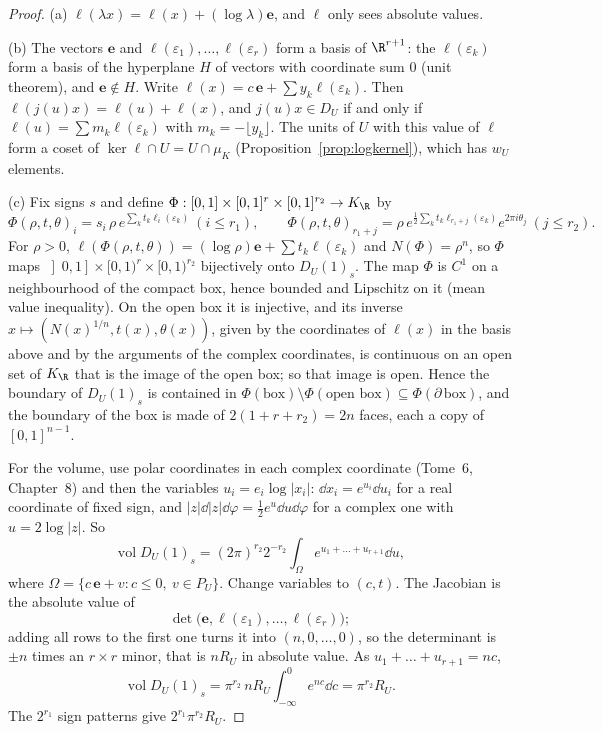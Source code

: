 \begin{proof}
(a) $\ell(\lambda x)=\ell(x)+(\log\lambda)\mathbf e$, and $\ell$ only sees absolute values.

(b) The vectors $\mathbf e$ and $\ell(\varepsilon_1),\dots,\ell(\varepsilon_r)$ form a basis of $\R^{r+1}$: the $\ell(\varepsilon_k)$ form a basis of
the hyperplane $H$ of vectors with coordinate sum $0$ (unit theorem), and $\mathbf e\notin H$. Write $\ell(x)=c\,\mathbf e+\sum
y_k\ell(\varepsilon_k)$. Then $\ell(j(u)x)=\ell(u)+\ell(x)$, and $j(u)x\in D_U$ if and only if $\ell(u)=\sum m_k\ell(\varepsilon_k)$ with
$m_k=-\lfloor y_k\rfloor$. The units of $U$ with this value of $\ell$ form a coset of $\ker\ell\cap U=U\cap\mu_K$
(Proposition~\ref{prop:logkernel}), which has $w_U$ elements.

(c) Fix signs $s$ and define $\Phi:[0,1]\times[0,1]^r\times[0,1]^{r_2}\to K_\R$ by
\[
\Phi(\rho,t,\theta)_i=s_i\,\rho\,e^{\sum_kt_k\ell_i(\varepsilon_k)}\ (i\le r_1),\qquad
\Phi(\rho,t,\theta)_{r_1+j}=\rho\,e^{\frac12\sum_kt_k\ell_{r_1+j}(\varepsilon_k)}e^{2\pi i\theta_j}\ (j\le r_2).
\]
For $\rho>0$, $\ell(\Phi(\rho,t,\theta))=(\log\rho)\mathbf e+\sum t_k\ell(\varepsilon_k)$ and $N(\Phi)=\rho^n$, so $\Phi$ maps
$\left]0,1\right]\times[0,1)^r\times[0,1)^{r_2}$ bijectively onto $D_U(1)_s$. The map $\Phi$ is $C^1$ on a neighbourhood of the compact box,
hence bounded and Lipschitz on it (mean value inequality). On the open box it is injective, and its inverse $x\mapsto
(N(x)^{1/n},t(x),\theta(x))$, given by the coordinates of $\ell(x)$ in the basis above and by the arguments of the complex
coordinates, is continuous on an open set of $K_\R$ that is the image of the open box; so that image is open. Hence the boundary of
$D_U(1)_s$ is contained in $\Phi(\text{box})\setminus\Phi(\text{open box})\subseteq\Phi(\partial\,\text{box})$, and the boundary of the box is
made of $2(1+r+r_2)=2n$ faces, each a copy of $[0,1]^{n-1}$.

For the volume, use polar coordinates in each complex coordinate (Tome~6, Chapter~8) and then the variables $u_i=e_i\log|x_i|$:
$\dd x_i=e^{u_i}\dd u_i$ for a real coordinate of fixed sign, and $|z|\dd|z|\dd\varphi=\frac12e^{u}\dd u\dd\varphi$ for a complex one
with $u=2\log|z|$. So
\[
\operatorname{vol}D_U(1)_s=(2\pi)^{r_2}2^{-r_2}\int_\Omega e^{u_1+\dots+u_{r+1}}\dd u,
\]
where $\Omega=\{c\,\mathbf e+v:c\le0,\ v\in P_U\}$.
Change variables to $(c,t)$. The Jacobian is the absolute value of
\[
\det\bigl(\mathbf e,\ell(\varepsilon_1),\dots,\ell(\varepsilon_r)\bigr);
\]
adding all rows to the first one turns it into $(n,0,\dots,0)$, so the determinant is $\pm n$ times an $r\times r$ minor, that is
$nR_U$ in absolute value. As $u_1+\dots+u_{r+1}=nc$,
\[
\operatorname{vol}D_U(1)_s=\pi^{r_2}\,nR_U\int_{-\infty}^0e^{nc}\dd c=\pi^{r_2}R_U.
\]
The $2^{r_1}$ sign patterns give $2^{r_1}\pi^{r_2}R_U$.
\end{proof}

